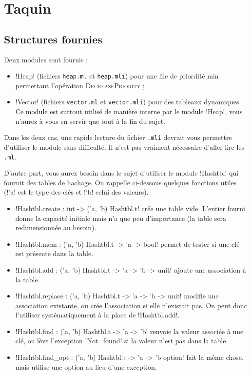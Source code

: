 \tcbstartrecording
\chapter{Taquin}

\section*{Structures fournies}

Deux modules sont fournis :
\begin{itemize}
  \item \ml!Heap! (fichiers \verb!heap.ml! et \verb!heap.mli!) pour
        une file de priordité min permettant l'opération
        \textsc{DecreasePriority} ;
  \item \ml!Vector! (fichiers \verb!vector.ml! et \verb!vector.mli!)
        pour des tableaux dynamiques. Ce module est surtout utilisé
        de manière interne par le module \ml!Heap!, vous n'aurez à vous
        en servir que tout à la fin du sujet.
\end{itemize}

Dans les deux cas, une rapide lecture du fichier \verb!.mli! devrait
vous permettre d'utiliser le module sans difficulté. Il n'est pas
vraiment nécessaire d'aller lire les \verb!.ml!.

D'autre part, vous aurez besoin dans le sujet d'utiliser le module
\ml!Hashtbl! qui fournit des tables de hachage. On rappelle
ci-dessous quelques fonctions utiles (\ml!'a! est le type des
clés et \ml!'b! celui des valeurs).
\begin{itemize}
  \item \ml!Hashtbl.create : int -> ('a, 'b) Hashtbl.t! crée une table
        vide. L'entier fourni donne la capacité initiale mais n'a que
        peu d'importance (la table sera redimensionnée au besoin).
  \item \ml!Hashtbl.mem : ('a, 'b) Hashtbl.t -> 'a -> bool!
        permet de tester si une clé est présente dans la table.
  \item \ml!Hashtbl.add : ('a, 'b) Hashtbl.t -> 'a -> 'b -> unit! ajoute
        une association à la table.
  \item \ml!Hashtbl.replace : ('a, 'b) Hashtbl.t -> 'a -> 'b -> unit!
        modifie une association existante, ou crée l'association si
        elle n'existait pas. On peut donc l'utiliser systématiquement à
        la place de \ml!Hashtbl.add!.
  \item \ml!Hashtbl.find : ('a, 'b) Hashtbl.t -> 'a -> 'b! renvoie
        la valeur associée à une clé, ou lève l'exception
        \ml!Not_found! si la valeur n'est pas dans la table.
  \item \ml!Hashtbl.find_opt : ('a, 'b) Hashtbl.t -> 'a -> 'b option!
        fait la même chose, mais utilise une option au lieu d'une
        exception.
\end{itemize}


